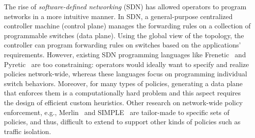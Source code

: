 
The rise of \emph{software-defined networking} (SDN) has allowed operators
to program networks in a more intuitive manner. In SDN, a general-purpose
centralized controller machine (control plane) manages the forwarding
rules on a collection of 
programmable switches (data plane). Using the global view of the 
topology, the controller can program forwarding rules on switches
based on the applications' requirements. 
However, existing
SDN programming languages like Frenetic~\cite{frenetic} and Pyretic~\cite{pyretic} are
too constraining: operators would ideally want to specify
and realize policies network-wide, whereas these languages focus on
programming individual switch behaviors.
Moreover, for many types of
  policies, generating a data plane 
  that enforces them is a
computationally hard problem and
this aspect requires the design of efficient custom heuristics.
Other research on network-wide policy enforcement, e.g.,
Merlin~\cite{merlin} and SIMPLE~\cite{simple} are tailor-made to
specific sets of policies, and thus, difficult to extend to support
other kinds of policies such as traffic isolation.



